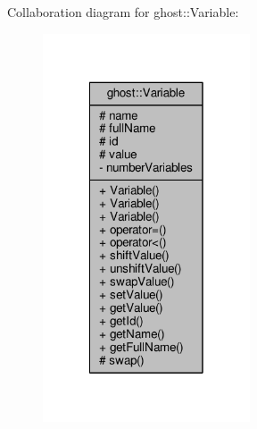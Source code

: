 Collaboration diagram for ghost\-:\-:Variable\-:
\nopagebreak
\begin{figure}[H]
\begin{center}
\leavevmode
\includegraphics[width=174pt]{classghost_1_1Variable__coll__graph}
\end{center}
\end{figure}
